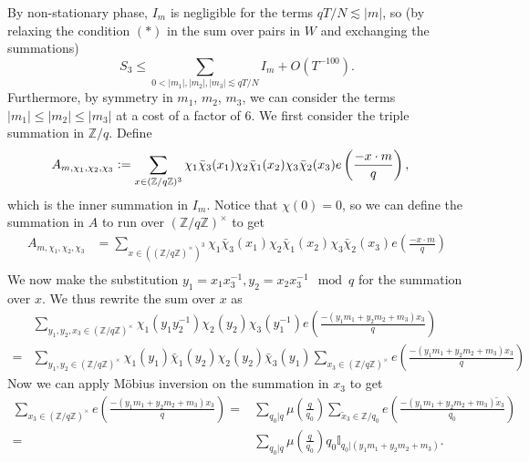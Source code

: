 By non-stationary phase, $I_m$ is negligible for the terms $qT/N\lesssim |m|$, so (by relaxing the condition $(*)$ in the sum over pairs in $W$ and exchanging the summations)
\begin{equation}
    S_3 \leq \sum_{0<|m_1|,|m_2|,|m_3|\lesssim qT/N} I_m + O(T^{-100}).
\end{equation}
Furthermore, by symmetry in $m_1$, $m_2$, $m_3$, we can consider the terms $|m_1|\leq |m_2|\leq |m_3|$ at a cost of a factor of $6$.
We first consider the triple summation in $\mathbb{Z}/q$. Define \begin{align*}
    A_{m,\chi_1,\chi_2,\chi_3}&\mathrel{\mathop:}= \sum_{x\in (\mathbb{Z}/q\mathbb{Z})^3}\chi_1\bar{\chi}_3(x_1)\chi_2\bar{\chi}_1(x_2)\chi_3\bar{\chi}_2(x_3) e\left(\frac{-x\cdot m}{q}\right),
\end{align*}
which is the inner summation in $I_m$.
Notice that $\chi(0)=0$, so we can define the summation in $A$ to run over $(\mathbb{Z}/q\mathbb{Z})^\times$ to get 
\begin{align*}
    A_{m,\chi_1,\chi_2,\chi_3}&= \sum_{x\in ((\mathbb{Z}/q\mathbb{Z})^\times)^3}\chi_1\bar{\chi}_3(x_1)\chi_2\bar{\chi}_1(x_2)\chi_3\bar{\chi}_2(x_3) e\left(\frac{-x\cdot m}{q}\right)\\
\end{align*}
We now make the substitution $y_1=x_1x_3^{-1}, y_2=x_2x_3^{-1} \mod q$ for the summation over $x$.
We thus rewrite the sum over $x$ as 
\begin{align*}
    &\sum_{y_1,y_2,x_3\in (\mathbb{Z}/q\mathbb{Z})^\times}
    \chi_1(y_1y_2^{-1})\chi_2(y_2)\chi_3(y_1^{-1})e\left(\frac{-(y_1m_1+y_2m_2+m_3)x_3}{q}\right)\\
    =&
    \sum_{y_1,y_2\in (\mathbb{Z}/q\mathbb{Z})^\times}\chi_1(y_1)\bar{\chi}_1(y_2)\chi_2(y_2)\bar{\chi}_3(y_1)\sum_{x_3\in (\mathbb{Z}/q\mathbb{Z})^\times}e\left(\frac{-(y_1m_1+y_2m_2+m_3)x_3}{q}\right)
\end{align*}
Now we can apply M\"obius inversion on the summation in $x_3$ to get \begin{align*}
   \sum_{x_3\in (\mathbb{Z}/q\mathbb{Z})^\times}e\left(\frac{-(y_1m_1+y_2m_2+m_3)x_3}{q}\right)=& \sum_{q_0|q} \mu\left(\frac{q}{q_0}\right)\sum_{\tilde{x}_3\in \mathbb{Z}/q_0}e\left(\frac{-(y_1m_1+y_2m_2+m_3)\tilde{x}_3}{q_0}\right) \\ =& \sum_{q_0|q} \mu\left(\frac{q}{q_0}\right) q_0 \mathbb{I}_{q_0|(y_1m_1+y_2m_2+m_3)}.
\end{align*}

